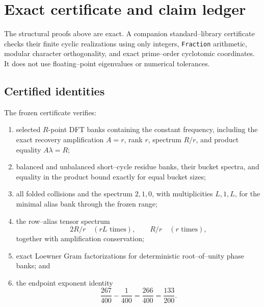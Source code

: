 \section{Exact certificate and claim ledger}
\label{sec:tpc40-certificate}

The structural proofs above are exact.  A companion standard--library
certificate checks their finite cyclic realizations using only integers,
\texttt{Fraction} arithmetic, modular character orthogonality, and exact
prime--order cyclotomic coordinates.  It does not use floating--point
eigenvalues or numerical tolerances.

\subsection{Certified identities}

The frozen certificate verifies:
\begin{enumerate}[label=(\roman*)]
 \item selected \(R\)-point DFT banks containing the constant frequency,
 including the exact recovery amplification \(A=r\), rank \(r\), spectrum
 \(R/r\), and product equality \(A\lambda=R\);
 \item balanced and unbalanced short--cycle residue banks, their bucket
 spectra, and equality in the product bound exactly for equal bucket
 sizes;
 \item all folded collisions and the spectrum \(2,1,0\), with
 multiplicities \(L,1,L\), for the minimal alias bank through the frozen
 range;
 \item the row--alias tensor spectrum
 \begin{equation}
  2R/r\quad(rL\text{ times}),
  \qquad
  R/r\quad(r\text{ times}),
  \label{eq:tpc40-certificate-tensor-spectrum}
 \end{equation}
 together with amplification conservation;
 \item exact Loewner Gram factorizations for deterministic root--of--unity
 phase banks; and
 \item the endpoint exponent identity
 \begin{equation}
  \frac{267}{400}-\frac1{400}
  =\frac{266}{400}=\frac{133}{200}.
  \label{eq:tpc40-certificate-endpoint-exponent}
 \end{equation}
\end{enumerate}

